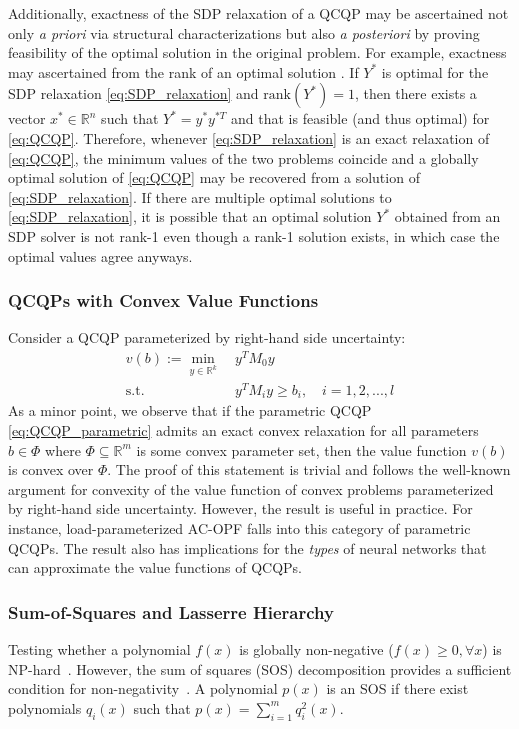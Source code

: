 \documentclass[10pt]{article} %
\theoremstyle{plain}
\theoremstyle{definition}
\theoremstyle{remark}
\begin{document}
Additionally, exactness of the SDP relaxation of a QCQP may be ascertained not only \textit{a priori} via structural characterizations but also \textit{a posteriori} by proving feasibility of the optimal solution in the original problem. 
For example, exactness may ascertained from the rank of an optimal solution \citep{lemon2016low}. If $Y^*$ is optimal for the SDP relaxation \eqref{eq:SDP_relaxation} and $\text{rank}(Y^*) = 1$, then there exists a vector $x^* \in \mathbb{R}^n$ such that $Y^* = y^* y^{*T}$ and that is feasible (and thus optimal) for \eqref{eq:QCQP}. Therefore, whenever \eqref{eq:SDP_relaxation} is an exact relaxation of \eqref{eq:QCQP}, the minimum values of the two problems coincide and a globally optimal solution of \eqref{eq:QCQP} may be recovered from a solution of \eqref{eq:SDP_relaxation}. If there are multiple optimal solutions to \eqref{eq:SDP_relaxation}, it is possible that an optimal solution $Y^*$ obtained from an SDP solver is not rank-1 even though a rank-1 solution exists, in which case the optimal values agree anyways.

\subsubsection{QCQPs with Convex Value Functions}

Consider a QCQP parameterized by right-hand side uncertainty:
\begin{align}
    v(b) := \min_{y \in \mathbb{R}^k}~& y^T M_0 y \label{eq:QCQP_parametric} \\
    \text{s.t.}~& y^T M_i y \geq b_i, \quad i = 1, 2, ..., l \nonumber
\end{align}
As a minor point, we observe that if the parametric QCQP \eqref{eq:QCQP_parametric} admits an exact convex relaxation for all parameters $b \in \Phi$ where $\Phi \subseteq \mathbb{R}^m$ is some convex parameter set, then the value function $v(b)$ is convex over $\Phi$. The proof of this statement is trivial and follows the well-known argument for convexity of the value function of convex problems parameterized by right-hand side uncertainty.  However, the result is useful in practice. For instance, load-parameterized AC-OPF falls into this category of parametric QCQPs. The result also has implications for the \textit{types} of neural networks that can approximate the value functions of QCQPs.
\subsubsection{Sum-of-Squares and Lasserre Hierarchy}
Testing whether a polynomial \( f(x) \) is globally non-negative (\( f(x) \geq 0, \forall x \)) is NP-hard~\citep{murty1985some}. However, the sum of squares (SOS) decomposition provides a sufficient condition for non-negativity~\citep{parrilo2003semidefinite}. A polynomial \( p(x) \) is an SOS if there exist polynomials \( q_i(x) \) such that $p(x) = \sum_{i=1}^m q_i^2(x)$. 
\end{document}
